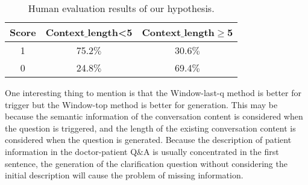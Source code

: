 \begin{table}[!htbp]
\centering
\small
\begin{tabular}{ccc} 
\toprule
Score&Context$\_$length\textless5&Context$\_$length$ \geq $5\\
\hline
1&75.2$\%$&30.6$\%$\\
0&24.8$\%$&69.4$\%$\\
\bottomrule
\end{tabular}
\caption{Human evaluation results of our hypothesis.}
\label{tab:example3}
\end{table}

One interesting thing to mention is that the Window-last-q method is better for trigger but the Window-top method is better for generation. This may be because the semantic information of the conversation content is considered when the question is triggered, and the length of the existing conversation content is considered when the question is generated. Because the description of patient information in the doctor-patient Q$\&$A is usually concentrated in the first sentence, the generation of the clarification question without considering the initial description will cause the problem of missing information.
